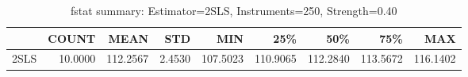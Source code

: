 \begin{table}[ht]
\centering
\caption{fstat summary: Estimator=2SLS, Instruments=250, Strength=0.40}
\begin{tabular}{lrrrrrrrr}
\toprule
 & COUNT & MEAN & STD & MIN & 25\% & 50\% & 75\% & MAX \\
\midrule
2SLS & 10.0000 & 112.2567 & 2.4530 & 107.5023 & 110.9065 & 112.2840 & 113.5672 & 116.1402 \\
\bottomrule
\end{tabular}
\end{table}
